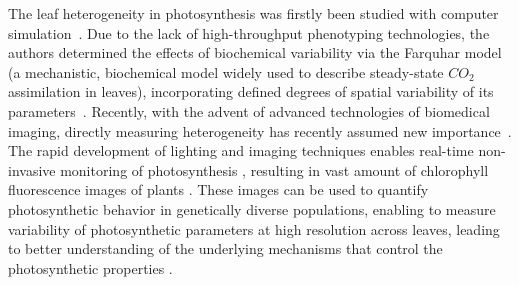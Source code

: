 \documentclass{bioinfo}
\begin{document}
The leaf heterogeneity in photosynthesis was firstly been studied  with computer simulation~\citep{chen2008effect}. Due to the lack of high-throughput phenotyping technologies, the authors determined the effects of biochemical variability via the Farquhar model (a mechanistic, biochemical model widely used to describe steady-state $CO_2$ assimilation in leaves), incorporating defined degrees of spatial variability of its parameters~\citep{sharkey1985o2,farquhar2001models}. %
%
Recently, with the advent of advanced technologies of biomedical imaging, directly measuring heterogeneity has recently assumed new importance~\citep{tiihonen1996cerebral,wieneke1999non,wang2000,cruz2014depi}. The rapid development of lighting and imaging techniques enables real-time non-invasive monitoring of photosynthesis \citep{houle2010phenomics,cruz2014depi}, resulting in vast amount of chlorophyll fluorescence images of plants \citep{wituszynska2013multivariable}. These images can be used to quantify photosynthetic behavior in genetically diverse populations, enabling to measure variability of photosynthetic parameters at high resolution across leaves, leading to better understanding of the underlying mechanisms that control the photosynthetic properties \citep{rascher2011non,fiorani2013future}. %
\end{document}
